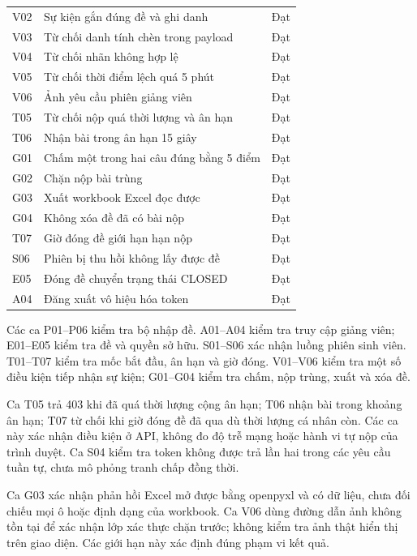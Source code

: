 \begin{longtable}{@{}L{1.2cm}L{11.4cm}L{1.8cm}@{}}
V02 & Sự kiện gắn đúng đề và ghi danh & Đạt\\
V03 & Từ chối danh tính chèn trong payload & Đạt\\
V04 & Từ chối nhãn không hợp lệ & Đạt\\
V05 & Từ chối thời điểm lệch quá 5 phút & Đạt\\
V06 & Ảnh yêu cầu phiên giảng viên & Đạt\\
T05 & Từ chối nộp quá thời lượng và ân hạn & Đạt\\
T06 & Nhận bài trong ân hạn 15 giây & Đạt\\
G01 & Chấm một trong hai câu đúng bằng 5 điểm & Đạt\\
G02 & Chặn nộp bài trùng & Đạt\\
G03 & Xuất workbook Excel đọc được & Đạt\\
G04 & Không xóa đề đã có bài nộp & Đạt\\
T07 & Giờ đóng đề giới hạn hạn nộp & Đạt\\
S06 & Phiên bị thu hồi không lấy được đề & Đạt\\
E05 & Đóng đề chuyển trạng thái CLOSED & Đạt\\
A04 & Đăng xuất vô hiệu hóa token & Đạt\\
\bottomrule
\end{longtable}

Các ca P01--P06 kiểm tra bộ nhập đề. A01--A04 kiểm tra truy cập giảng viên; E01--E05 kiểm tra đề và quyền sở hữu. S01--S06 xác nhận luồng phiên sinh viên. T01--T07 kiểm tra mốc bắt đầu, ân hạn và giờ đóng. V01--V06 kiểm tra một số điều kiện tiếp nhận sự kiện; G01--G04 kiểm tra chấm, nộp trùng, xuất và xóa đề.

Ca T05 trả 403 khi đã quá thời lượng cộng ân hạn; T06 nhận bài trong khoảng ân hạn; T07 từ chối khi giờ đóng đề đã qua dù thời lượng cá nhân còn. Các ca này xác nhận điều kiện ở API, không đo độ trễ mạng hoặc hành vi tự nộp của trình duyệt. Ca S04 kiểm tra token không được trả lần hai trong các yêu cầu tuần tự, chưa mô phỏng tranh chấp đồng thời.

Ca G03 xác nhận phản hồi Excel mở được bằng openpyxl và có dữ liệu, chưa đối chiếu mọi ô hoặc định dạng của workbook. Ca V06 dùng đường dẫn ảnh không tồn tại để xác nhận lớp xác thực chặn trước; không kiểm tra ảnh thật hiển thị trên giao diện. Các giới hạn này xác định đúng phạm vi kết quả.

